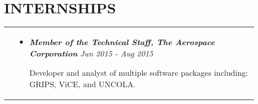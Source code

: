 \documentclass[10pt]{article}
\begin{document}
\section{\textbf{INTERNSHIPS}}
\vspace*{-\baselineskip}
\hskip-1.7in
\begin{tabularx}{1.5\linewidth}{>{\raggedleft\scshape}p{3cm}X}

  &\begin{itemize}
    \setlength\itemsep{.005em}
  \item \textbf{\textit{Member of the Technical Staff, The Aerospace Corporation}}    \hspace{17 mm}\textit{Jun 2015 - Aug 2015}
  
Developer and analyst of multiple software packages including: GRIPS, ViCE, and UNCOLA.
               
  \end{itemize} 

\end{tabularx}
\end{document}
